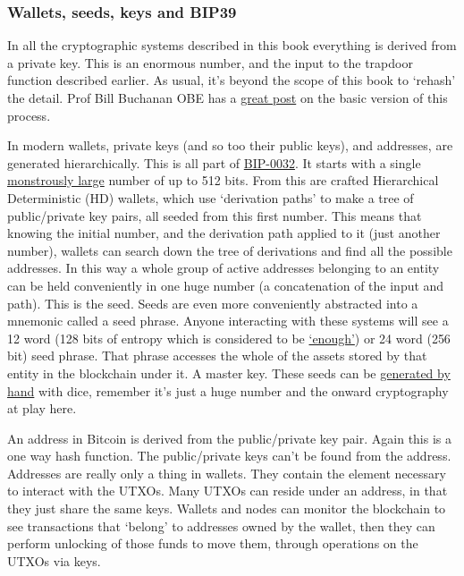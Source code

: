 \subsubsection{Wallets, seeds, keys and BIP39}
In all the cryptographic systems described in this book everything is derived from a private key. This is an enormous number, and the input to the trapdoor function described earlier. As usual, it's beyond the scope of this book to `rehash' the detail. Prof Bill Buchanan OBE has a \href{https://medium.com/asecuritysite-when-bob-met-alice/can-i-derive-the-private-key-from-the-public-key-ba3609256ec}{great post} on the basic version of this process.\par
In modern wallets, private keys (and so too their public keys), and addresses, are generated hierarchically. This is all part of \href{https://github.com/bitcoin/bips/blob/master/bip-0032.mediawiki}{BIP-0032}. It starts with a single \href{https://www.wolframalpha.com/input?i=2\%5E512}{monstrously large} number of up to 512 bits. From this are crafted Hierarchical Deterministic (HD) wallets, which use `derivation paths' to make a tree of public/private key pairs, all seeded from this first number. This means that knowing the initial number, and the derivation path applied to it (just another number), wallets can search down the tree of derivations and find all the possible addresses. In this way a whole group of active addresses belonging to an entity can be held conveniently in one huge number (a concatenation of the input and path). This is the seed. Seeds are even more conveniently abstracted into a mnemonic called a seed phrase. Anyone interacting with these systems will see a 12 word (128 bits of entropy which is considered to be \href{https://twitter.com/adam3us/status/1433375602808066049}{`enough'}) or 24 word (256 bit) seed phrase. That phrase accesses the whole of the assets stored by that entity in the blockchain under it. A master key. These seeds can be \href{https://vault12.com/securemycrypto/cryptocurrency-security-how-to/dice-crypto-recovery-seed/}{generated by hand} with dice, remember it's just a huge number and the onward cryptography at play here.\par
An address in Bitcoin is derived from the public/private key pair. Again this is a one way hash function. The public/private keys can't be found from the address. Addresses are really only a thing in wallets. They contain the element necessary to interact with the UTXOs. Many UTXOs can reside under an address, in that they just share the same keys. Wallets and nodes can monitor the blockchain to see transactions that `belong' to addresses owned by the wallet, then they can perform unlocking of those funds to move them, through operations on the UTXOs via keys.\par
